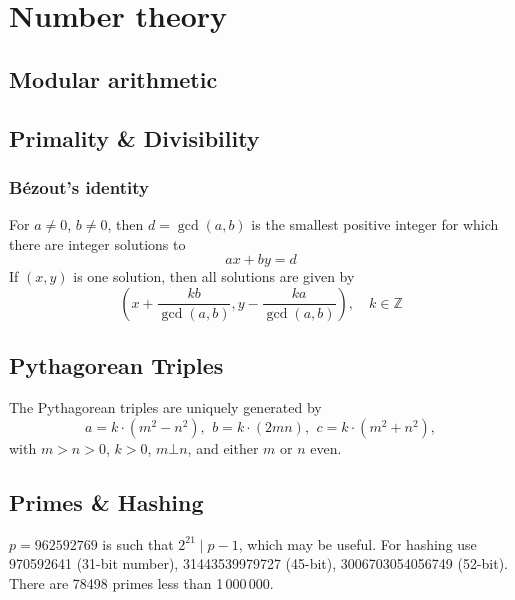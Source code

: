 \chapter{Number theory}

\section{Modular arithmetic}

\section{Primality \& Divisibility}

	\subsection{Bézout's identity}
	For $a \neq 0$, $b \neq 0$, then $d=\gcd(a,b)$ is the smallest positive integer for which there are integer solutions to
	$$ax+by=d$$
	If $(x,y)$ is one solution, then all solutions are given by
	$$\left(x+\frac{kb}{\gcd(a,b)}, y-\frac{ka}{\gcd(a,b)}\right), \quad k\in\mathbb{Z}$$


\section{Pythagorean Triples}
 The Pythagorean triples are uniquely generated by
 \[ a=k\cdot (m^{2}-n^{2}),\ \,b=k\cdot (2mn),\ \,c=k\cdot (m^{2}+n^{2}), \]
 with $m > n > 0$, $k > 0$, $m \bot n$, and either $m$ or $n$ even.

\section{Primes \& Hashing}
	$p=962592769$ is such that $2^{21} \mid p-1$, which may be useful. For hashing
	use 970592641 (31-bit number), 31443539979727 (45-bit), 3006703054056749
	(52-bit). There are 78498 primes less than 1\,000\,000.

